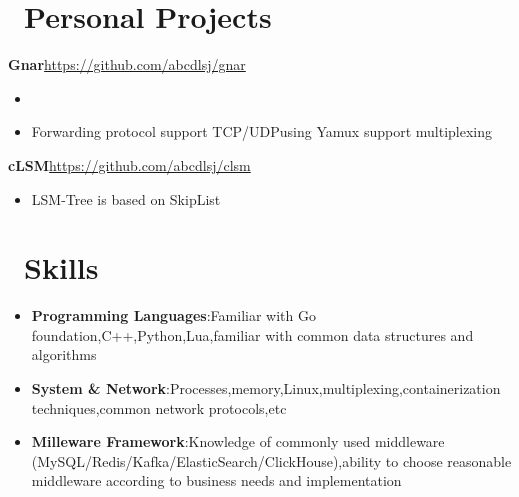 \documentclass{resume}
\newcommand{\en}[1]{#1}
\newcommand{\zh}[1]{}
\begin{document}
\section{\faGithubAlt\ \en{Personal Projects}\zh{Personal}}
{\textbf{\en{Gnar}\zh{Gnar}}}\hfill{\url{https://github.com/abcdlsj/gnar}}
\begin{itemize}[parsep=0.6ex]
      \item \en{}
            \zh{内网端口转发工具,类似于 Frp/Ngork}
      \item \en{Forwarding protocol support TCP/UDPusing Yamux support multiplexing}
            \zh{转发协议支持 TCP/UDP,使用 Yamux 支持多路复用}
\end{itemize}

{\textbf{\en{cLSM}\zh{cLSM}}}\hfill{\url{https://github.com/abcdlsj/clsm}}
\begin{itemize}[parsep=0.6ex]
      \item \en{LSM-Tree is based on SkipList}
            \zh{基于 SkipList 的 LSM-Tree 数据结构实现,内存层使用 SkipList,磁盘层使用有序键值对}
\end{itemize}

\section{\faCogs\ \en{Skills}\zh{技能}}
\begin{itemize}[parsep=0.6ex]
      \item \en{\textbf{Programming Languages}:Familiar with Go foundation,C++,Python,Lua,familiar with common data structures and algorithms}
            \zh{\textbf{编程语言}:熟悉 Go,了解 C++、Python、Lua,熟悉常用数据结构与算法}
      \item \en{\textbf{System \& Network}:Processes,memory,Linux,multiplexing,containerization techniques,common network protocols,etc}
            \zh{\textbf{系统 \& 网络}:进程、内存、Linux、多路复用、容器化技术、常见网络协议等}
      \item \en{\textbf{Milleware Framework}:Knowledge of commonly used middleware (MySQL/Redis/Kafka/ElasticSearch/ClickHouse),ability to choose reasonable middleware according to business needs and implementation}
            \zh{\textbf{中间件}:了解常用中间件及组件(MySQL/Redis/Kafka/ElasticSearch/ClickHouse),能根据业务需求选择合理的中间件并接入}
\end{itemize}
\end{document}
